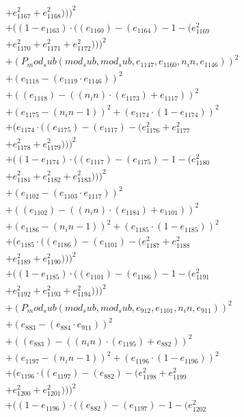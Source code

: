 \documentclass[10pt, a4paper]{article}
\begin{document}
\begin{small}
\begin{align*}
& + e_{1167}^{2} + e_{1168}^{2})))^{2} \\
& + ((1 - e_{1163})  \cdot  ((e_{1160}) - (e_{1164}) - 1 - (e_{1169}^{2} \\
& + e_{1170}^{2} + e_{1171}^{2} + e_{1172}^{2})))^{2} \\
& + (P_mod_sub(mod_sub, mod_sub, e_{1147}, e_{1160}, n_in, e_{1146}))^{2} \\
& + (e_{1118} - (e_{1119}  \cdot  e_{1146}))^{2} \\
& + ((e_{1118}) - ((n_in)  \cdot  (e_{1173}) + e_{1117}))^{2} \\
& + (e_{1175} - (n_in - 1))^{2} + (e_{1174}  \cdot  (1 - e_{1174}))^{2} \\
& + (e_{1174}  \cdot  ((e_{1175}) - (e_{1117}) - (e_{1176}^{2} + e_{1177}^{2} \\
& + e_{1178}^{2} + e_{1179}^{2})))^{2} \\
& + ((1 - e_{1174})  \cdot  ((e_{1117}) - (e_{1175}) - 1 - (e_{1180}^{2} \\
& + e_{1181}^{2} + e_{1182}^{2} + e_{1183}^{2})))^{2} \\
& + (e_{1102} - (e_{1103}  \cdot  e_{1117}))^{2} \\
& + ((e_{1102}) - ((n_in)  \cdot  (e_{1184}) + e_{1101}))^{2} \\
& + (e_{1186} - (n_in - 1))^{2} + (e_{1185}  \cdot  (1 - e_{1185}))^{2} \\
& + (e_{1185}  \cdot  ((e_{1186}) - (e_{1101}) - (e_{1187}^{2} + e_{1188}^{2} \\
& + e_{1189}^{2} + e_{1190}^{2})))^{2} \\
& + ((1 - e_{1185})  \cdot  ((e_{1101}) - (e_{1186}) - 1 - (e_{1191}^{2} \\
& + e_{1192}^{2} + e_{1193}^{2} + e_{1194}^{2})))^{2} \\
& + (P_mod_sub(mod_sub, mod_sub, e_{912}, e_{1101}, n_in, e_{911}))^{2} \\
& + (e_{883} - (e_{884}  \cdot  e_{911}))^{2} \\
& + ((e_{883}) - ((n_in)  \cdot  (e_{1195}) + e_{882}))^{2} \\
& + (e_{1197} - (n_in - 1))^{2} + (e_{1196}  \cdot  (1 - e_{1196}))^{2} \\
& + (e_{1196}  \cdot  ((e_{1197}) - (e_{882}) - (e_{1198}^{2} + e_{1199}^{2} \\
& + e_{1200}^{2} + e_{1201}^{2})))^{2} \\
& + ((1 - e_{1196})  \cdot  ((e_{882}) - (e_{1197}) - 1 - (e_{1202}^{2} \\

\end{align*}
\end{small}
\end{document}
